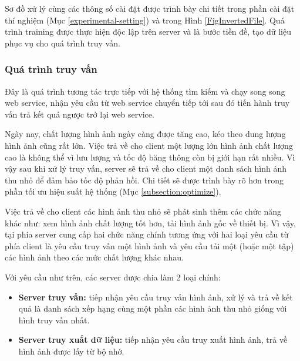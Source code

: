 Sơ đồ xử lý cùng các thông số cài đặt được trình bày chi tiết trong phần cài đặt thí nghiệm (Mục \ref{experimental-setting}) và trong Hình \ref{FigInvertedFile}. Quá trình training được thực hiện độc lập trên server và là bước tiền đề, tạo dữ liệu phục vụ cho quá trình truy vấn.

\subsubsection{Quá trình truy vấn}
\label{subsubsection:truyvan_server}
Đây là quá trình tương tác trực tiếp với hệ thống tìm kiếm và chạy song song web service, nhận yêu cầu từ web service chuyển tiếp tới sau đó tiến hành truy vấn trả kết quả ngược trở lại web service.

Ngày nay, chất lượng hình ảnh ngày càng được tăng cao, kéo theo dung lượng hình ảnh cũng rất lớn. Việc trả về cho client một lượng lớn hình ảnh chất lượng cao là không thể vì lưu lượng và tốc độ băng thông còn bị giới hạn rất nhiều. Vì vậy sau khi xử lý truy vấn, server sẽ trả về cho client một danh sách hình ảnh thu nhỏ để đảm bảo tốc độ phản hồi. Chi tiết sẽ được trình bày rõ hơn trong phần tối ưu hiệu suất hệ thống (Mục \ref{subsection:optimize}).

Việc trả về cho client các hình ảnh thu nhỏ sẽ phát sinh thêm các chức năng khác như: xem hình ảnh chất lượng tốt hơn, tải hình ảnh gốc về thiết bị. Vì vậy, tại phía server cung cấp hai chức năng chính tương ứng với hai loại yêu cầu từ phía client là yêu cầu truy vấn một hình ảnh và yêu cầu tải một (hoặc một tập) các hình ảnh theo các mức chất lượng khác nhau.

Với yêu cầu như trên, các server được chia làm 2 loại chính:

\begin{itemize}
\item \textbf{Server truy vấn:} tiếp nhận yêu cầu truy vấn hình ảnh, xử lý và trả về kết quả là danh sách xếp hạng cùng một phần các hình ảnh thu nhỏ giống với hình truy vấn nhất.

\item \textbf{Server truy xuất dữ liệu:} tiếp nhận yêu cầu truy xuất hình ảnh, trả về hình ảnh được lấy từ bộ nhớ.
\end{itemize}

